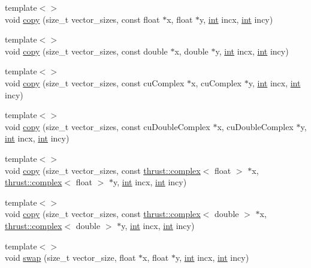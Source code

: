 \begin{DoxyCompactItemize}
\item 
{\footnotesize template$<$$>$ }\\void \hyperlink{classcublas__wrap_a675bf3fa91fd899d6a473c2d075ffdaf}{copy} (size\-\_\-t vector\-\_\-sizes, const float $\ast$x, float $\ast$y, \hyperlink{classint}{int} incx, \hyperlink{classint}{int} incy)
\item 
{\footnotesize template$<$$>$ }\\void \hyperlink{classcublas__wrap_a8c6cc3b08598ca526dc7b969dd2ff1a6}{copy} (size\-\_\-t vector\-\_\-sizes, const double $\ast$x, double $\ast$y, \hyperlink{classint}{int} incx, \hyperlink{classint}{int} incy)
\item 
{\footnotesize template$<$$>$ }\\void \hyperlink{classcublas__wrap_a5fc2a218e20405aa4d6a85ae09e10e2c}{copy} (size\-\_\-t vector\-\_\-sizes, const cu\-Complex $\ast$x, cu\-Complex $\ast$y, \hyperlink{classint}{int} incx, \hyperlink{classint}{int} incy)
\item 
{\footnotesize template$<$$>$ }\\void \hyperlink{classcublas__wrap_a894bf8386d2715a0ddf9748983ecbf7a}{copy} (size\-\_\-t vector\-\_\-sizes, const cu\-Double\-Complex $\ast$x, cu\-Double\-Complex $\ast$y, \hyperlink{classint}{int} incx, \hyperlink{classint}{int} incy)
\item 
{\footnotesize template$<$$>$ }\\void \hyperlink{classcublas__wrap_a9b3c81723ba51a3de7e27badea5d44e4}{copy} (size\-\_\-t vector\-\_\-sizes, const \hyperlink{test__deflation__typedefs_8h_a25cabcac5deb559feab415e2c445d8ba}{thrust\-::complex}$<$ float $>$ $\ast$x, \hyperlink{test__deflation__typedefs_8h_a25cabcac5deb559feab415e2c445d8ba}{thrust\-::complex}$<$ float $>$ $\ast$y, \hyperlink{classint}{int} incx, \hyperlink{classint}{int} incy)
\item 
{\footnotesize template$<$$>$ }\\void \hyperlink{classcublas__wrap_a9e5670e3761bce09b325f1d14a65f33f}{copy} (size\-\_\-t vector\-\_\-sizes, const \hyperlink{test__deflation__typedefs_8h_a25cabcac5deb559feab415e2c445d8ba}{thrust\-::complex}$<$ double $>$ $\ast$x, \hyperlink{test__deflation__typedefs_8h_a25cabcac5deb559feab415e2c445d8ba}{thrust\-::complex}$<$ double $>$ $\ast$y, \hyperlink{classint}{int} incx, \hyperlink{classint}{int} incy)
\item 
{\footnotesize template$<$$>$ }\\void \hyperlink{classcublas__wrap_aa29ea5c5e5353d0e1ccb30df7b42ebeb}{swap} (size\-\_\-t vector\-\_\-size, float $\ast$x, float $\ast$y, \hyperlink{classint}{int} incx, \hyperlink{classint}{int} incy)

\end{DoxyCompactItemize}
